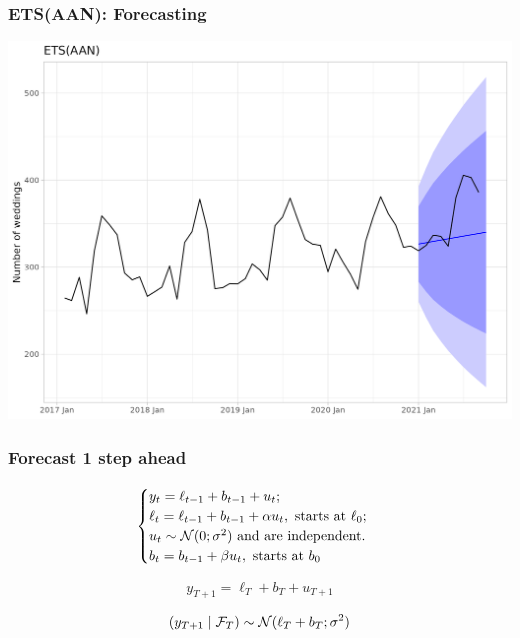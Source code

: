 \begin{frame}
	\frametitle{ETS(AAN): Forecasting}
	
	\includegraphics[width=\textwidth]{pictures/om_ts_02-052.png}
	
\end{frame}


\begin{frame}
	\frametitle{Forecast 1 step ahead}
	
	\[
	\begin{cases}
		y_t = \ell_{t-1} + b_{t-1} + u_t; \\
		\ell_t = \ell_{t-1} + b_{t-1} + \alpha u_t, \text{ starts at } \ell_0; \\
		u_t \sim \mathcal{N}(0;\sigma^2) \text{ and are independent.} \\
		b_t = b_{t-1} + \beta u_t,\text{ starts at } b_0 \\
	\end{cases}
	\]
	
	\[
	y_{T+1} = \ell_T + b_T + u_{T+1}
	\]
	
	\[
	(y_{T+1} \mid \mathcal F_T) \sim \mathcal{N}(\ell_T + b_T; \sigma^2)
	\]
	
\end{frame}


